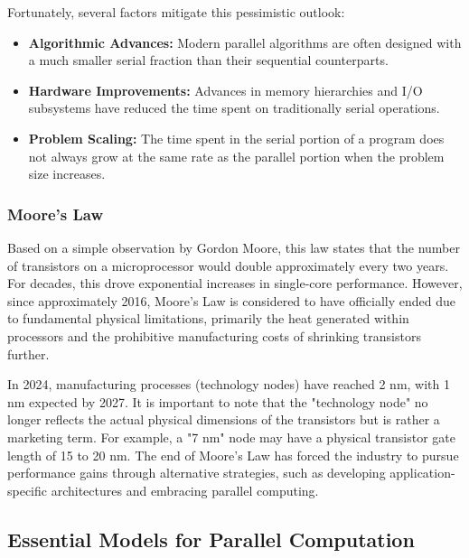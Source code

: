 Fortunately, several factors mitigate this pessimistic outlook:
\begin{itemize}
    \item \textbf{Algorithmic Advances:} Modern parallel algorithms are often designed with a much smaller serial fraction than their sequential counterparts.
    \item \textbf{Hardware Improvements:} Advances in memory hierarchies and I/O subsystems have reduced the time spent on traditionally serial operations.
    \item \textbf{Problem Scaling:} The time spent in the serial portion of a program does not always grow at the same rate as the parallel portion when the problem size increases.
\end{itemize}

\subsubsection{Moore's Law}
Based on a simple observation by Gordon Moore, this law states that the number of transistors on a microprocessor would double approximately every two years. For decades, this drove exponential increases in single-core performance. However, since approximately 2016, Moore's Law is considered to have officially ended due to fundamental physical limitations, primarily the heat generated within processors and the prohibitive manufacturing costs of shrinking transistors further.

In 2024, manufacturing processes (technology nodes) have reached 2 nm, with 1 nm expected by 2027. It is important to note that the "technology node" no longer reflects the actual physical dimensions of the transistors but is rather a marketing term. For example, a "7 nm" node may have a physical transistor gate length of 15 to 20 nm. The end of Moore's Law has forced the industry to pursue performance gains through alternative strategies, such as developing application-specific architectures and embracing parallel computing.

\subsection{Essential Models for Parallel Computation}


